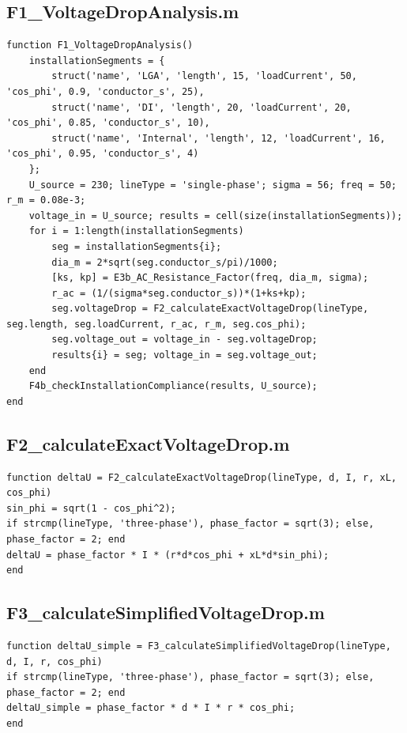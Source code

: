 \documentclass[12pt, a4paper]{article}
\begin{document}
\subsection{F1\_VoltageDropAnalysis.m}
\begin{lstlisting}[caption={Main script for voltage drop analysis, including multi-segment installations.}, label={lst:F1}]
function F1_VoltageDropAnalysis()
    installationSegments = {
        struct('name', 'LGA', 'length', 15, 'loadCurrent', 50, 'cos_phi', 0.9, 'conductor_s', 25),
        struct('name', 'DI', 'length', 20, 'loadCurrent', 20, 'cos_phi', 0.85, 'conductor_s', 10),
        struct('name', 'Internal', 'length', 12, 'loadCurrent', 16, 'cos_phi', 0.95, 'conductor_s', 4)
    };
    U_source = 230; lineType = 'single-phase'; sigma = 56; freq = 50; r_m = 0.08e-3;
    voltage_in = U_source; results = cell(size(installationSegments));
    for i = 1:length(installationSegments)
        seg = installationSegments{i};
        dia_m = 2*sqrt(seg.conductor_s/pi)/1000;
        [ks, kp] = E3b_AC_Resistance_Factor(freq, dia_m, sigma);
        r_ac = (1/(sigma*seg.conductor_s))*(1+ks+kp);
        seg.voltageDrop = F2_calculateExactVoltageDrop(lineType, seg.length, seg.loadCurrent, r_ac, r_m, seg.cos_phi);
        seg.voltage_out = voltage_in - seg.voltageDrop;
        results{i} = seg; voltage_in = seg.voltage_out;
    end
    F4b_checkInstallationCompliance(results, U_source);
end
\end{lstlisting}

\subsection{F2\_calculateExactVoltageDrop.m}
\begin{lstlisting}[caption={Implements the full Blondel's formula for accurate AC voltage drop.}, label={lst:F2}]
function deltaU = F2_calculateExactVoltageDrop(lineType, d, I, r, xL, cos_phi)
sin_phi = sqrt(1 - cos_phi^2);
if strcmp(lineType, 'three-phase'), phase_factor = sqrt(3); else, phase_factor = 2; end
deltaU = phase_factor * I * (r*d*cos_phi + xL*d*sin_phi);
end
\end{lstlisting}

\subsection{F3\_calculateSimplifiedVoltageDrop.m}
\begin{lstlisting}[caption={Implements the simplified (resistive only) voltage drop formula for comparison.}, label={lst:F3}]
function deltaU_simple = F3_calculateSimplifiedVoltageDrop(lineType, d, I, r, cos_phi)
if strcmp(lineType, 'three-phase'), phase_factor = sqrt(3); else, phase_factor = 2; end
deltaU_simple = phase_factor * d * I * r * cos_phi;
end
\end{lstlisting}
\end{document}
